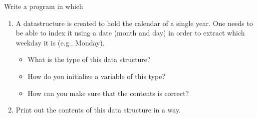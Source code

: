 Write a program in which
\begin{enumerate}
  \item A datastructure is created to hold the calendar of a single year. One needs to be able to index it using a date (month and day) in order to extract which weekday it is (e.g., Monday).
    \begin{itemize}
      \item What is the type of this data structure?
      \item How do you initialize a variable of this type?
      \item How can you make sure that the contents is correct?
    \end{itemize}
  \item Print out the contents of this data structure in a  way.
\end{enumerate}
